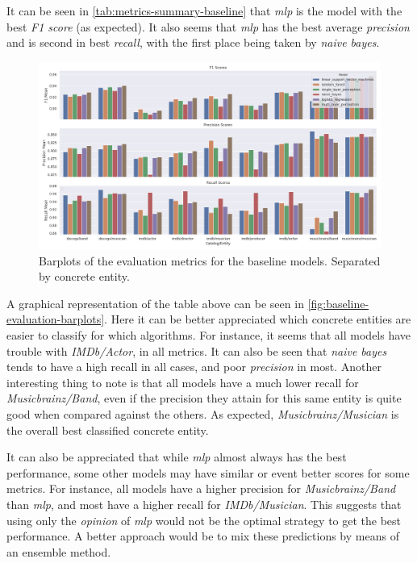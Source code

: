 \documentclass[epsfig,a4paper,11pt,titlepage,twoside,openany]{book}
\begin{document}
It can be seen in \autoref{tab:metrics-summary-baseline} that \textit{mlp} is the model with the best \textit{F1 score} (as expected). It also seems that \textit{mlp} has the best average \textit{precision} and is second in best \textit{recall}, with the first place being taken by \textit{naive bayes}.

\begin{figure}[H]
  \centering \includegraphics[width=\textwidth]{baseline_evluation_main_metrics_barplot} 
  \caption{Barplots of the evaluation metrics for the baseline models. Separated by concrete entity.}
  \label{fig:baseline-evaluation-barplots}
\end{figure}

A graphical representation of the table above can be seen in \autoref{fig:baseline-evaluation-barplots}. Here it can be better appreciated which concrete entities are easier to classify for which algorithms. For instance, it seems that all models have trouble with \textit{IMDb/Actor}, in all metrics. It can also be seen that \textit{naive bayes} tends to have a high recall in all cases, and poor \textit{precision} in most. Another interesting thing to note is that all models have a much lower recall for \textit{Musicbrainz/Band}, even if the precision they attain for this same entity is quite good when compared against the others. As expected, \textit{Musicbrainz/Musician} is the overall best classified concrete entity. 

It can also be appreciated that while \textit{mlp} almost always has the best performance, some other models may have similar or event better scores for some metrics. For instance, all models have a higher precision for \textit{Musicbrainz/Band} than \textit{mlp}, and most have a higher recall for \textit{IMDb/Musician}. This suggests that using only the \textit{opinion} of \textit{mlp} would not be the optimal strategy to get the best performance. A better approach would be to mix these predictions by means of an ensemble method.
\end{document}
